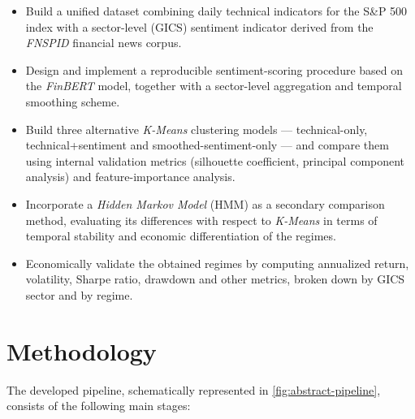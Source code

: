 \begin{itemize}
  \item Build a unified dataset combining daily technical indicators for
  the S\&P 500 index with a sector-level (GICS) sentiment indicator
  derived from the \textit{FNSPID} financial news corpus.
  \item Design and implement a reproducible sentiment-scoring procedure
  based on the \textit{FinBERT} model, together with a sector-level
  aggregation and temporal smoothing scheme.
  \item Build three alternative \textit{K-Means} clustering models ---
  technical-only, technical+sentiment and smoothed-sentiment-only --- and
  compare them using internal validation metrics (silhouette coefficient,
  principal component analysis) and feature-importance analysis.
  \item Incorporate a \textit{Hidden Markov Model} (HMM) as a secondary
  comparison method, evaluating its differences with respect to
  \textit{K-Means} in terms of temporal stability and economic
  differentiation of the regimes.
  \item Economically validate the obtained regimes by computing
  annualized return, volatility, Sharpe ratio, drawdown and other
  metrics, broken down by GICS sector and by regime.
\end{itemize}

\section*{Methodology}

The developed pipeline, schematically represented in
\autoref{fig:abstract-pipeline}, consists of the following main stages:

